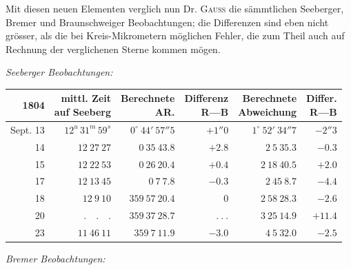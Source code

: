 Mit diesen neuen Elementen verglich nun Dr. \textsc{Gauss} die sämmtlichen Seeberger, Bremer
und Braunschweiger Beobachtungen; die Differenzen sind eben nicht grösser, als die
bei Kreis-Mikrometern möglichen Fehler, die zum Theil auch auf Rechnung der
verglichenen Sterne kommen mögen.

\begin{center}
\textit{Seeberger Beobachtungen:}
\end{center}

\begin{center}
\begingroup\fontsize{8}{10}\selectfont\setlength{\tabcolsep}{3pt}\renewcommand{\arraystretch}{1.12}
\begin{tabular}{r|r|r|r|r|r}
1804 & \shortstack{mittl. Zeit\\auf Seeberg} & \shortstack{Berechnete\\AR.} & \shortstack{Differenz\\R—B} & \shortstack{Berechnete\\Abweichung} & \shortstack{Differ.\\R—B} \\ \hline
Sept. 13 & $12^{u}\,31^{m}\,59^{s}$ & $0^\circ\ 44'\ 57''5$ & $+1''0$ & $1^\circ\ 52'\ 34''7$ & $-2''3$ \\
14 & $12\ 27\ 27$ & $0\ 35\ 43.8$ & $+2.8$ & $2\ 5\ 35.3$ & $-0.3$ \\
15 & $12\ 22\ 53$ & $0\ 26\ 20.4$ & $+0.4$ & $2\ 18\ 40.5$ & $+2.0$ \\
17 & $12\ 13\ 45$ & $0\ 7\ 7.8$ & $-0.3$ & $2\ 45\ 8.7$ & $-4.4$ \\
18 & $12\ 9\ 10$ & $359\ 57\ 20.4$ & $0$ & $2\ 58\ 28.3$ & $-2.6$ \\
20 & $ .\quad .\quad . $ & $359\ 37\ 28.7$ & $ .\ .\ . $ & $3\ 25\ 14.9$ & $+11.4$ \\
23 & $11\ 46\ 11$ & $359\ 7\ 11.9$ & $-3.0$ & $4\ 5\ 32.0$ & $-2.5$ \\
\end{tabular}\endgroup
\end{center}
%
\begin{center}
\textit{Bremer Beobachtungen:}
\end{center}

